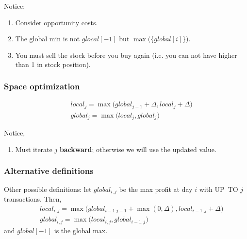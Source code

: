 Notice:
\begin{enumerate}
\item Consider opportunity costs.
\item The global min is not $glocal[-1]$ but $\max\big(\{global[i]\}\big)$.
\item You must sell the stock before you buy again (i.e. you can not have higher than 1 in stock position). 
\end{enumerate}

\subsubsection{Space optimization}
\begin{eqnarray}
&& local_{j} = \max\Big(global_{j-1} + \Delta, local_{j}+\Delta\Big)
\nonumber \\
&& global_{j} = \max\Big(local_{j}, global_{j}\Big)
\end{eqnarray}

Notice,
\begin{enumerate}
\item Must iterate $j$ \textbf{backward}; otherwise we will use the updated value. 
\end{enumerate}

\subsubsection{Alternative definitions}
Other possible definitions: let $global_{i, j}$ be the max profit
at day $i$ with UP\ TO $j$ transactions. Then, 
\begin{eqnarray}
&& local_{i,j} = \max\Big(global_{i-1.j-1} + \max(0, \Delta), local_{i-1,j}+\Delta\Big)
\nonumber \\
&& global_{i,j} = \max\Big(local_{i, j}, global_{i-1,j}\Big)
\end{eqnarray}
and $global[-1]$ is the global max. 
